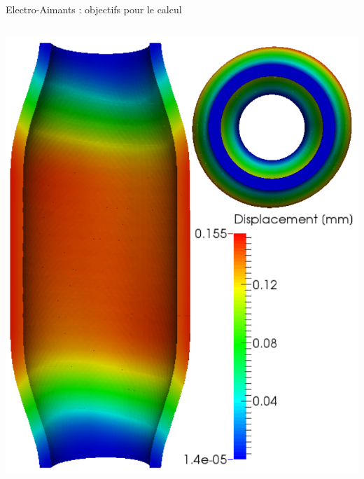 \begin{frame}{Electro-Aimants : objectifs pour le calcul}
\begin{columns}[c]
    \includegraphics[height=.4\textheight]{Figures/cmi/Magnetmodels_bmap+dilat_HL31.png}

\end{columns}
\end{frame}
